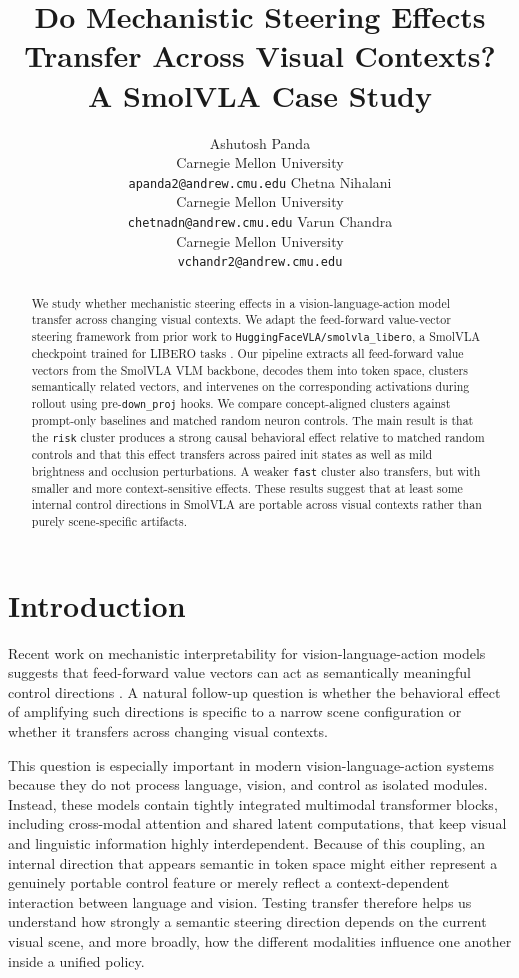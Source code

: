 \documentclass[11pt]{article}
\title{Do Mechanistic Steering Effects Transfer Across Visual Contexts?\\
A SmolVLA Case Study}
\author{
  Ashutosh Panda \\
  Carnegie Mellon University \\
  \texttt{apanda2@andrew.cmu.edu}
  \And
  Chetna Nihalani \\
  Carnegie Mellon University \\
  \texttt{chetnadn@andrew.cmu.edu}
  \And
  Varun Chandra \\
  Carnegie Mellon University \\
  \texttt{vchandr2@andrew.cmu.edu}
}
\begin{document}
\maketitle

\begin{abstract}
We study whether mechanistic steering effects in a vision-language-action model transfer across changing visual contexts. We adapt the feed-forward value-vector steering framework from prior work \citep{haon2025mechanistic} to \texttt{HuggingFaceVLA/smolvla\_libero}, a SmolVLA checkpoint \citep{shukor2025smolvla,huggingfacevla2025smolvla_libero} trained for LIBERO tasks \citep{liu2023libero}. Our pipeline extracts all feed-forward value vectors from the SmolVLA VLM backbone, decodes them into token space, clusters semantically related vectors, and intervenes on the corresponding activations during rollout using pre-\texttt{down\_proj} hooks. We compare concept-aligned clusters against prompt-only baselines and matched random neuron controls. The main result is that the \texttt{risk} cluster produces a strong causal behavioral effect relative to matched random controls and that this effect transfers across paired init states as well as mild brightness and occlusion perturbations. A weaker \texttt{fast} cluster also transfers, but with smaller and more context-sensitive effects. These results suggest that at least some internal control directions in SmolVLA are portable across visual contexts rather than purely scene-specific artifacts.
\end{abstract}

\section{Introduction}

Recent work on mechanistic interpretability for vision-language-action models suggests that feed-forward value vectors can act as semantically meaningful control directions \citep{haon2025mechanistic}. A natural follow-up question is whether the behavioral effect of amplifying such directions is specific to a narrow scene configuration or whether it transfers across changing visual contexts.

This question is especially important in modern vision-language-action systems because they do not process language, vision, and control as isolated modules. Instead, these models contain tightly integrated multimodal transformer blocks, including cross-modal attention and shared latent computations, that keep visual and linguistic information highly interdependent. Because of this coupling, an internal direction that appears semantic in token space might either represent a genuinely portable control feature or merely reflect a context-dependent interaction between language and vision. Testing transfer therefore helps us understand how strongly a semantic steering direction depends on the current visual scene, and more broadly, how the different modalities influence one another inside a unified policy.
\end{document}
